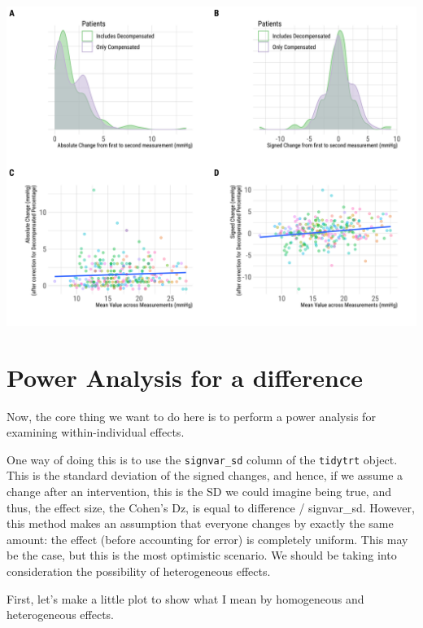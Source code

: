 \documentclass[
]{article}
\begin{document}
\includegraphics{figures/unnamed-chunk-51-1.png}

\hypertarget{power-analysis-for-a-difference}{%
\section{Power Analysis for a
difference}\label{power-analysis-for-a-difference}}

Now, the core thing we want to do here is to perform a power analysis
for examining within-individual effects.

One way of doing this is to use the \texttt{signvar\_sd} column of the
\texttt{tidytrt} object. This is the standard deviation of the signed
changes, and hence, if we assume a change after an intervention, this is
the SD we could imagine being true, and thus, the effect size, the
Cohen's Dz, is equal to difference / signvar\_sd. However, this method
makes an assumption that everyone changes by exactly the same amount:
the effect (before accounting for error) is completely uniform. This may
be the case, but this is the most optimistic scenario. We should be
taking into consideration the possibility of heterogeneous effects.

First, let's make a little plot to show what I mean by homogeneous and
heterogeneous effects.
\end{document}
